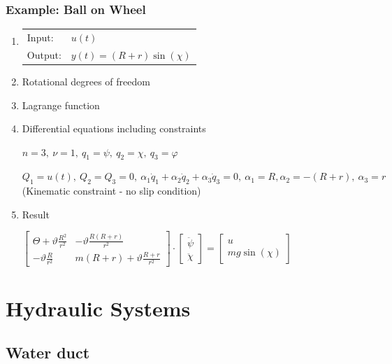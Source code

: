 \documentclass[10pt,a4paper]{scrartcl}
\begin{document}
\begin{multicols*}{3}
\subsubsection{Example: Ball on Wheel}


\begin{enumerate}
\item \begin{tabular}{ll}Input:&$u(t)$\\Output: &$y(t)=(R+r)\sin(\chi)$\end{tabular}

\item Rotational degrees of freedom
\item Lagrange function
\item Differential equations including constraints

$n=3,\ \nu=1,\ q_1=\psi,\ q_2=\chi,\ q_3=\varphi$


$Q_1=u(t),\ Q_2=Q_3=0,\ \alpha_1\dot{q}_1+\alpha_2\dot{q}_2+\alpha_3\dot{q}_3=0,\ \alpha_1=R,\alpha_2=-(R+r),\ \alpha_3=r$ (Kinematic constraint - no slip condition)

\item Result

$\begin{bmatrix} \Theta+\vartheta \frac{R^2}{r^2}&-\vartheta\frac{R(R+r)}{r^2}\\-\vartheta\frac{R}{r^2}&m(R+r)+\vartheta\frac{R+r}{r^2}\end{bmatrix}\cdot\begin{bmatrix}\ddot{\psi}\\\ddot{\chi}\end{bmatrix}=\begin{bmatrix}u\\mg\sin(\chi)\end{bmatrix}$

\end{enumerate}

\vfill
\null
\columnbreak

\section{Hydraulic Systems}

\subsection{Water duct}


\end{multicols*}
\end{document}
